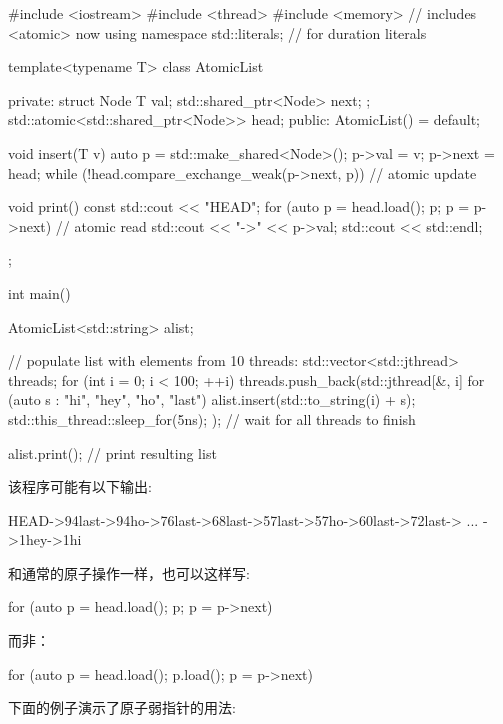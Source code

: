 \begin{cpp}
#include <iostream>
#include <thread>
#include <memory> // includes <atomic> now
using namespace std::literals; // for duration literals

template<typename T>
class AtomicList {
	private:
	struct Node {
		T val;
		std::shared_ptr<Node> next;
	};
	std::atomic<std::shared_ptr<Node>> head;
public:
	AtomicList() = default;

	void insert(T v) {
		auto p = std::make_shared<Node>();
		p->val = v;
		p->next = head;
		while (!head.compare_exchange_weak(p->next, p)) { // atomic update
		}
	}

	void print() const {
		std::cout << "HEAD";
		for (auto p = head.load(); p; p = p->next) { // atomic read
			std::cout << "->" << p->val;
		}
		std::cout << std::endl;
	}
};

int main()
{
	AtomicList<std::string> alist;

	// populate list with elements from 10 threads:
	{
		std::vector<std::jthread> threads;
		for (int i = 0; i < 100; ++i) {
			threads.push_back(std::jthread{[&, i]{
					for (auto s : {"hi", "hey", "ho", "last"}) {
						alist.insert(std::to_string(i) + s);
						std::this_thread::sleep_for(5ns);
					}
			}});
		}
	} // wait for all threads to finish

	alist.print(); // print resulting list
	}
\end{cpp}

该程序可能有以下输出:

\begin{shell}
HEAD->94last->94ho->76last->68last->57last->57ho->60last->72last-> ... ->1hey->1hi
\end{shell}

和通常的原子操作一样，也可以这样写:

\begin{cpp}
for (auto p = head.load(); p; p = p->next)
\end{cpp}

而非：

\begin{cpp}
for (auto p = head.load(); p.load(); p = p->next)
\end{cpp}


下面的例子演示了原子弱指针的用法:


